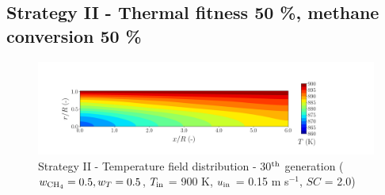 \documentclass[preprint,12pt]{elsarticle}
\begin{document}


\clearpage





\subsection{Strategy II - Thermal fitness 50 \%, methane conversion 50 \%} 
\label{subsec:S25050}

%

\begin{figure}[h!]
\centering
\includegraphics[width=150mm]{results/5Eq/50C_50T/GEN30-TFIELD.png}
\caption{\label{fig:5RES5050G30-TField} Strategy II - Temperature field distribution - 30$^{\rm{th}}$ generation ($w_{\rm{CH_4}} = 0.5, w_T = 0.5$, $T_{\rm{in}}$ = 900 K, $u_{\rm{in}}$ = 0.15 m s$^{-1}$, $SC$ = 2.0)}
\end{figure}

%
\end{document}
